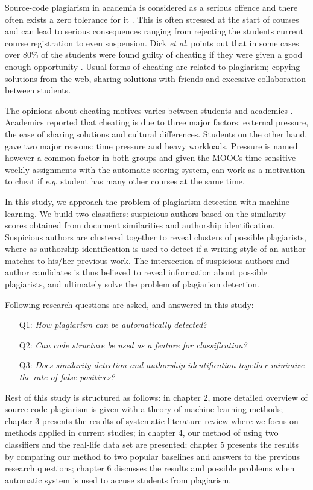 \documentclass[english, grading]{tktltiki2}
\newcommand{\etal}{\textit{et al}. }
\newcommand{\eg}{\textit{e}.\textit{g}. }
\theoremstyle{definition}
\theoremstyle{remark}
\numberwithin{equation}{section} %
\begin{document}
Source-code plagiarism in academia is considered as a serious offence and there often exists a zero tolerance for it \cite{TDSCP2008}. This is often stressed at the start of courses and can lead to serious consequences ranging from rejecting the students current course registration to even suspension. Dick \etal points out that in some cases over 80\% of the students were found guilty of cheating if they were given a good enough opportunity \cite{Dick:2002:ASC:782941.783000}. Usual forms of cheating are related to plagiarism; copying solutions from the web, sharing solutions with friends and excessive collaboration between students. 

The opinions about cheating motives varies between students and academics \cite{TDSCP2008}. Academics reported that cheating is due to three major factors: external pressure, the ease of sharing solutions and cultural differences. Students on the other hand, gave two major reasons: time pressure and heavy workloads. Pressure is named however a common factor in both groups and given the MOOCs time sensitive weekly assignments with the automatic scoring system, can work as a motivation to cheat if \eg student has many other courses at the same time. 

In this study, we approach the problem of plagiarism detection with machine learning. We build two classifiers: suspicious authors based on the similarity scores obtained from document similarities and authorship identification. Suspicious authors are clustered together to reveal clusters of possible plagiarists, where as authorship identification is used to detect if a writing style of an author matches to his/her previous work. The intersection of suspicious authors and author candidates is thus believed to reveal information about possible plagiarists, and ultimately solve the problem of plagiarism detection. 

Following research questions are asked, and answered in this study:

\begin{itemize}
    \item[Q1:] \emph{How plagiarism can be automatically detected?}
    \item[Q2:] \emph{Can code structure be used as a feature for classification?}
    \item[Q3:] \emph{Does similarity detection and authorship identification together minimize the rate of false-positives?}
\end{itemize}

Rest of this study is structured as follows: in chapter 2, more detailed overview of source code plagiarism is given with a theory of machine learning methods; chapter 3 presents the results of systematic literature review where we focus on methods applied in current studies; in chapter 4, our method of using two classifiers and the real-life data set are presented; chapter 5 presents the results by comparing our method to two popular baselines and answers to the previous research questions; chapter 6 discusses the results and possible problems when automatic system is used to accuse students from plagiarism. 
\end{document}
